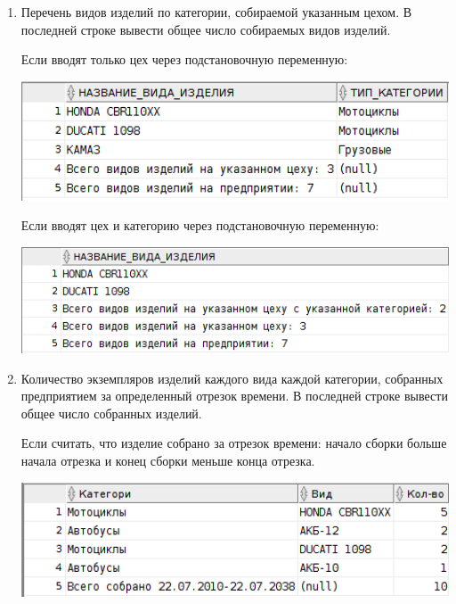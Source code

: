 \begin{enumerate}

    \item Перечень видов изделий по категории, собираемой указанным цехом.
    В последней строке вывести общее число собираемых видов изделий.

    Если вводят только цех через подстановочную переменную:

    

    \includegraphics[width=16cm]{./screenshots/results/result1a.png}

    Если вводят цех и категорию через подстановочную переменную:

    

    \includegraphics[width=16cm]{./screenshots/results/result1b.png}

    \item Количество экземпляров изделий каждого вида каждой категории, собранных предприятием за определенный отрезок времени.
    В последней строке вывести общее число собранных изделий.

    Если считать, что изделие собрано за отрезок времени: начало сборки больше начала отрезка и конец сборки меньше конца отрезка.

    

    \includegraphics[width=16cm]{./screenshots/results/result2a.png}


\end{enumerate}

